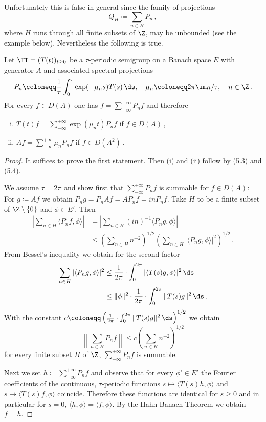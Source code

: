 Unfortunately this is false in general since the family of projections
\[
Q_{H} \coloneqq \sum_{n \in H} P_{n}\,,
\]
where $H$ runs through all finite subsets of $\Z$, may be unbounded (see the example below).
Nevertheless the following is true.
\begin{theorem}\label{thm:a3-5.4}
Let $\TT = (T(t))_{t \geq 0}$ be a $\tau$-periodic semigroup on a Banach space $E$ with generator $A$ and associated spectral projections
\[
P_{n} \coloneqq  \frac{1}{\tau}\int_{0}^{\tau} \exp(-\mu_{n}s)T(s) \, \ds, \quad \mu_{n} \coloneqq 2\pi\im n/\tau, \quad n \in \Z \,.
\]
For every $f \in D(A)$ one has $f = \sum_{-\infty}^{+\infty} P_{n}f$ and therefore
\begin{enumerate}[(i)]
\item 
$T(t)f = \sum_{-\infty}^{+\infty} \exp(\mu_{n}t)P_{n}f$ \quad if $f \in D(A)$\,,

\item 
$Af = \sum_{-\infty}^{+\infty} \mu_{n}P_{n}f$ \quad if $f \in D(A^{2})$\,.
\end{enumerate}
\end{theorem}
\begin{proof}
It suffices to prove the first statement. Then (i) and (ii) follow by (5.3) and (5.4).

We assume $\tau = 2\pi$ and show first that $\sum_{-\infty}^{+\infty} P_{n}f$ is summable for $f \in D(A)$: For $g \coloneqq Af$ we obtain $P_{n}g = P_{n}Af = AP_{n}f = inP_{n}f$.
Take $H$ to be a finite subset of $\Z \setminus \{0\}$ and $\phi \in E'$. Then
\begin{align*}
\left|\sum_{n \in H} \langle P_{n}f,\phi \rangle\right|
&= \left|\sum_{n \in H} (in)^{-1} \langle P_{n}g,\phi \rangle\right| \\
&\leq \left(\sum_{n \in H} n^{-2}\right)^{1/2}\left(\sum_{n \in H} |\langle P_{n}g,\phi \rangle|^{2}\right)^{1/2}\,.
\end{align*}
From Bessel's inequality we obtain for the second factor
\begin{align*}
\sum_{n \in H} |\langle P_{n}g,\phi \rangle|^{2} &\leq \frac{1}{2\pi} \cdot \int_{0}^{2\pi} |\langle T(s)g,\phi \rangle|^{2} \, \ds \\
&\leq \|\phi\|^{2} \cdot \frac{1}{2\pi} \cdot \int_{0}^{2\pi} \|T(s)g\|^{2} \, \ds \,.
\end{align*}
With the constant $c \coloneqq \left(\frac{1}{2\pi} \cdot \int_{0}^{2\pi} \|T(s)g\|^{2} \, \ds\right)^{1/2}$ we obtain
\[
\left\|\sum_{n \in H} P_{n}f\right\| \leq c\left(\sum_{n \in H} n^{-2}\right)^{1/2}
\]
for every finite subset $H$ of $\Z$, \ie $\sum_{-\infty}^{+\infty} P_{n}f$ is summable.

Next we set $h \coloneqq \sum_{-\infty}^{+\infty} P_{n}f$ and observe that for every $\phi' \in E'$ the Fourier coefficients of the continuous, $\tau$-periodic functions
$s \mapsto \langle T(s)h,\phi \rangle$ and $s \mapsto \langle T(s)f,\phi \rangle$
coincide.
Therefore these functions are identical for $s \geq 0$ and in particular for $s = 0$, \ie $\langle h,\phi \rangle = \langle f,\phi \rangle$.
By the Hahn-Banach Theorem we obtain $f = h$.
\end{proof}

